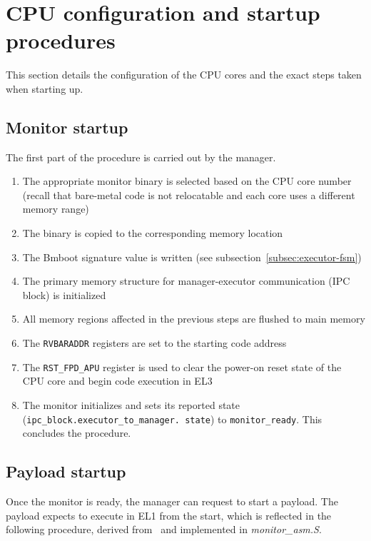 \section{CPU configuration and startup procedures}

This section details the configuration of the CPU cores and the exact steps taken when starting up.

\subsection{Monitor startup}

The first part of the procedure is carried out by the manager.

\begin{enumerate}
    \item The appropriate monitor binary is selected based on the CPU core number (recall that bare-metal code is not relocatable and each core uses a different memory range)
    \item The binary is copied to the corresponding memory location
    \item The Bmboot signature value is written (see subsection~\ref{subsec:executor-fsm})
    \item The primary memory structure for manager-executor communication (IPC block) is initialized
    \item All memory regions affected in the previous steps are flushed to main memory
    \item The \texttt{RVBARADDR} registers are set to the starting code address
    \item The \texttt{RST\_FPD\_APU} register is used to clear the power-on reset state of the CPU core and begin code execution in EL3
    \item The monitor initializes and sets its reported state (\texttt{ipc\_block.executor\_to\_manager. state}) to \texttt{monitor\_ready}. This concludes the procedure.
\end{enumerate}

\subsection{Payload startup}

Once the monitor is ready, the manager can request to start a payload. The payload expects to execute in EL1 from the start, which is reflected in the following procedure, derived from~\cite{arm-baremetal} and implemented in \textit{monitor\_asm.S}.

